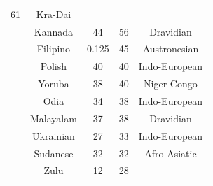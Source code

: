 {\begin{tabular}{|c|c|c|c|c|}
61 &
	

Kra-Dai \\
	\thetablecount\stepcounter{tablecount} &

Kannada &
	

44 &
	

56 &
	

Dravidian \\

	\thetablecount\stepcounter{tablecount} &
Filipino &
	

0.125 &
	

45 &
	

Austronesian \\

	\thetablecount\stepcounter{tablecount} &
Polish &
	

40 &
	

40 &
	

Indo-European \\
	\thetablecount\stepcounter{tablecount} &

Yoruba &
	

38 &
	

40 &
	

Niger-Congo \\
	\thetablecount\stepcounter{tablecount} &

Odia &
	

34 &
	

38 &
	

Indo-European \\

	\thetablecount\stepcounter{tablecount} &
Malayalam &
	

37 &
	

38 &
	

Dravidian \\
	\thetablecount\stepcounter{tablecount} &

Ukrainian &
	

27 &
	

33 &
	

Indo-European \\
	\thetablecount\stepcounter{tablecount} &

Sudanese &
	

32 &
	

32 &
	

Afro-Asiatic \\
	\thetablecount\stepcounter{tablecount} &

Zulu &
	

12 &
	

28 &
	


\end{tabular}}
